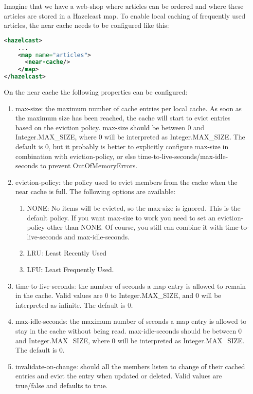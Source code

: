 Imagine that we have a web-shop where articles can be ordered and where these articles are stored in a Hazelcast map. To enable local caching of frequently used articles, the near cache needs to be configured like this:
\begin{lstlisting}[language=xml]
<hazelcast>
    ...
    <map name="articles">
      <near-cache/>
    </map>
</hazelcast>
\end{lstlisting}
On the near cache the following properties can be configured:
\begin{enumerate}
\item max-size: the maximum number of cache entries per local cache. As soon as the maximum size has been reached, the cache will start to evict entries based on the eviction policy. max-size should be between 0 and Integer.MAX\_SIZE, where 0 will be interpreted as Integer.MAX\_SIZE. The default is 0, but it probably is better to explicitly configure max-size in combination with eviction-policy, or else time-to-live-seconds/max-idle-seconds to prevent OutOfMemoryErrors.
\item eviction-policy: the policy used to evict members from the cache when the near cache is full. The following options are available:
\begin{enumerate}
 \item NONE: No items will be evicted, so the max-size is ignored. This is the default policy. If you want max-size to work you need to set an eviction-policy other than NONE. Of course, you still can combine it with time-to-live-seconds and  max-idle-seconds.
 \item LRU: Least Recently Used
 \item LFU: Least Frequently Used.
\end{enumerate}
\item time-to-live-seconds: the number of seconds a map entry is allowed to remain in the cache. Valid values are 0 to Integer.MAX\_SIZE, and 0 will be interpreted as infinite. The default is 0.
\item max-idle-seconds: the maximum number of seconds a map entry is allowed to stay in the cache without being read. max-idle-seconds should be between 0 and Integer.MAX\_SIZE, where 0 will be interpreted as Integer.MAX\_SIZE. The default is 0. 
\item invalidate-on-change: should all the members listen to change of their cached entries and evict the entry when updated or deleted. Valid values are true/false and defaults to true. 
\end{enumerate}

